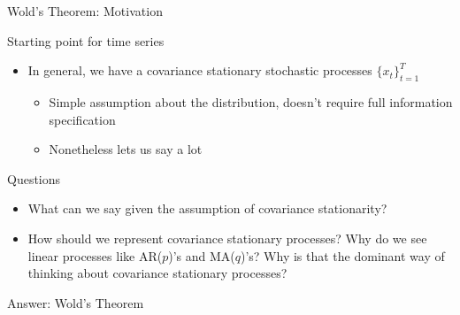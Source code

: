 \documentclass[handout]{beamer}
\begin{document}







\begin{frame}[shrink]{Wold's Theorem: Motivation}

Starting point for time series
\begin{itemize}
  \item In general, we have a
    \alert{covariance stationary stochastic processes}
    $\{x_t\}_{t=1}^T$
    \begin{itemize}
      \item Simple assumption about the distribution, doesn't require
        full information specification
      \item Nonetheless lets us say a lot
    \end{itemize}
\end{itemize}
\pause
Questions
\begin{itemize}
  \item What can we say given the assumption of covariance stationarity?
  \item How should we \alert{represent} covariance stationary processes?
    Why do we see linear processes like AR($p$)'s and MA($q$)'s?
    Why is that the dominant way of thinking about covariance stationary
    processes?
\end{itemize}
\alert{Answer}: Wold's Theorem
\end{frame}
\end{document}
